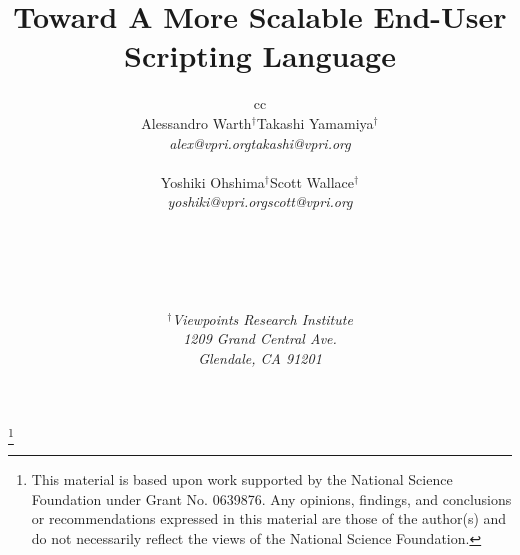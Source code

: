 \documentclass[10pt,twocolumn]{article}
\begin{document}
\title{Toward A More Scalable End-User Scripting Language}
\author{%
\begin{tabular}{cc}
  \begin{tabular}{ccc}
    Alessandro Warth$^{\dag}$ &\hspace*{1cm}  &  Takashi Yamamiya$^{\dag}$\\
    {\it alex@vpri.org} &   & {\it takashi@vpri.org}\\
\\
    Yoshiki Ohshima$^{\dag}$  & & Scott Wallace$^{\dag}$\\
    {\it yoshiki@vpri.org} & & {\it scott@vpri.org}
  \end{tabular}\\
\\
\end{tabular}\\
\begin{tabular}{c}
$^{\dag}${\it Viewpoints Research Institute}\\
{\it 1209 Grand Central Ave.}\\
{\it Glendale, CA 91201}\\
\end{tabular}
}

\maketitle\thispagestyle{empty}

\renewcommand{\thefootnote}{\fnsymbol{footnote}}%
\footnote[0]{This material is based upon work supported by the National Science
Foundation under Grant No. 0639876.
Any opinions, findings, and conclusions or recommendations expressed
in this material are those of the author(s) and do not necessarily
reflect the views of the National Science Foundation.}%





%






\end{document}
